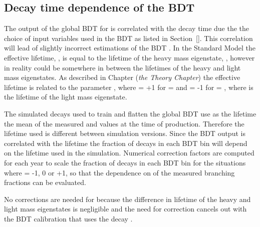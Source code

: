 \subsection{Decay time dependence of the \bsmumu BDT \pdf}
\label{sec:ADGBDTcorrections}
The output of the global BDT for \bmumu is correlated with the \bmumu decay time due the the choice of input variables used in the BDT as listed in Section~\ref{}. This correlation will lead of slightly incorrect estimations of the \bsmumu BDT \pdf. In the Standard Model the \bsmumu effective lifetime, \tmumu, is equal to the lifetime of the heavy \bs mass eigenstate, \tH, however in reality \tmumu could be somewhere in between the lifetimes of the heavy and light mass eigenstates. As described in Chapter ({\it the Theory Chapter}) the \bsmumu effective lifetime is related to the parameter \ADG, where \ADG = +1 for \tmumu = \tH and \ADG = -1 for \tmumu = \tL, where \tL is the lifetime of the light \bsmumu mass eigenstate.

The simulated decays used to train and flatten the global BDT use as the \bsmumu lifetime the mean of the measured \tH and \tL values at the time of production. Therefore the lifetime used is different between simulation versions. Since the BDT output is correlated with the lifetime the fraction of \bsmumu decays in each BDT bin will depend on the lifetime used in the simulation. Numerical correction factors are computed for each year to scale the fraction of \bsmumu decays in each BDT bin for the situations where \ADF = -1, 0 or +1, so that the dependence on \ADG of the measured branching fractions can be evaluated.

No corrections are needed for \bdmumu because the difference in lifetime of the heavy and light \bd mass eigenstates is negligible and the need for correction cancels out with the BDT calibration that uses the \bd decay \bdkpi. 


